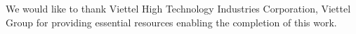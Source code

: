 \documentclass[runningheads]{llncs}
\begin{document}
\begin{credits}
\subsubsection{\ackname} 
We would like to thank Viettel High Technology Industries Corporation, Viettel Group for providing essential resources enabling the completion of this work.

\end{credits}
%
%
%





\end{document}
